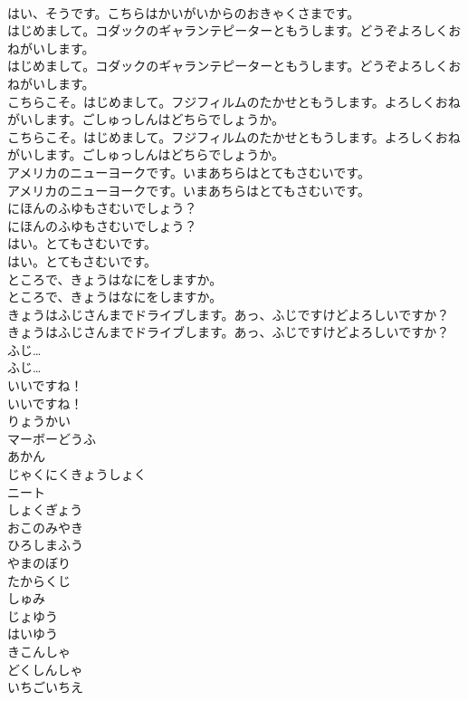 \documentclass[8pt]{extreport}
\begin{document}
\begin{CJK}{UTF8}{min}
\\	はい、そうです。こちらはかいがいからのおきゃくさまです。 
\\	はじめまして。コダックのギャランテピーターともうします。どうぞよろしくおねがいします。	
\\	はじめまして。コダックのギャランテピーターともうします。どうぞよろしくおねがいします。 
\\	こちらこそ。はじめまして。フジフィルムのたかせともうします。よろしくおねがいします。ごしゅっしんはどちらでしょうか。	
\\	こちらこそ。はじめまして。フジフィルムのたかせともうします。よろしくおねがいします。ごしゅっしんはどちらでしょうか。 
\\	アメリカのニューヨークです。いまあちらはとてもさむいです。	
\\	アメリカのニューヨークです。いまあちらはとてもさむいです。 
\\	にほんのふゆもさむいでしょう？	
\\	にほんのふゆもさむいでしょう？ 
\\	はい。とてもさむいです。	
\\	はい。とてもさむいです。 
\\	ところで、きょうはなにをしますか。	
\\	ところで、きょうはなにをしますか。 
\\	きょうはふじさんまでドライブします。あっ、ふじですけどよろしいですか？	
\\	きょうはふじさんまでドライブします。あっ、ふじですけどよろしいですか？ 
\\	ふじ…	
\\	ふじ… 
\\	いいですね！	
\\	いいですね！ 
\\	りょうかい
\\	マーボーどうふ
\\	あかん
\\	じゃくにくきょうしょく
\\	ニート
\\	しょくぎょう
\\	おこのみやき
\\	ひろしまふう
\\	やまのぼり
\\	たからくじ
\\	しゅみ
\\	じょゆう
\\	はいゆう
\\	きこんしゃ
\\	どくしんしゃ
\\	いちごいちえ

\end{CJK}
\end{document}
